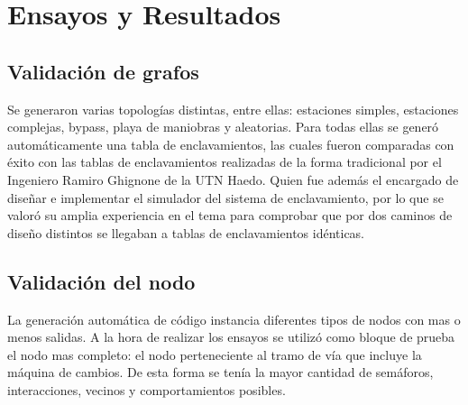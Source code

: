 
\chapter{Ensayos y Resultados} %

\label{Chapter4} %




\section{Validación de grafos}
	
	Se generaron varias topologías distintas, entre ellas: estaciones simples, estaciones complejas, bypass, playa de maniobras y aleatorias. Para todas ellas se generó automáticamente una tabla de enclavamientos, las cuales fueron comparadas con éxito con las tablas de enclavamientos realizadas de la forma tradicional por el Ingeniero Ramiro Ghignone de la UTN Haedo. Quien fue además el encargado de diseñar e implementar el simulador del sistema de enclavamiento, por lo que se valoró su amplia experiencia en el tema para comprobar que por dos caminos de diseño distintos se llegaban a tablas de enclavamientos idénticas.
			
\section{Validación del nodo}

	La generación automática de código instancia diferentes tipos de nodos con mas o menos salidas. A la hora de realizar los ensayos se utilizó como bloque de prueba el nodo mas completo: el nodo perteneciente al tramo de vía que incluye la máquina de cambios. De esta forma se tenía la mayor cantidad de semáforos, interacciones, vecinos y comportamientos posibles.
	
